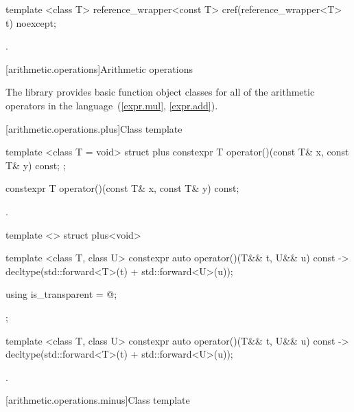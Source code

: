 %
\begin{itemdecl}
template <class T> reference_wrapper<const T> cref(reference_wrapper<T> t) noexcept;
\end{itemdecl}

\begin{itemdescr}
\pnum\returns {}.
\end{itemdescr}

[arithmetic.operations]{Arithmetic operations}

\pnum
The library provides basic function object classes for all of the arithmetic
operators in the language~(\ref{expr.mul}, \ref{expr.add}).

[arithmetic.operations.plus]{Class template }

%
\begin{itemdecl}
template <class T = void> struct plus {
  constexpr T operator()(const T& x, const T& y) const;
};
\end{itemdecl}

%
\begin{itemdecl}
constexpr T operator()(const T& x, const T& y) const;
\end{itemdecl}

\begin{itemdescr}
\pnum\returns {}.
\end{itemdescr}

%
\begin{itemdecl}
template <> struct plus<void> {
  template <class T, class U> constexpr auto operator()(T&& t, U&& u) const
    -> decltype(std::forward<T>(t) + std::forward<U>(u));

  using is_transparent = @\unspec@;
};
\end{itemdecl}

%
\begin{itemdecl}
template <class T, class U> constexpr auto operator()(T&& t, U&& u) const
    -> decltype(std::forward<T>(t) + std::forward<U>(u));
\end{itemdecl}

\begin{itemdescr}
\pnum\returns {}.
\end{itemdescr}

[arithmetic.operations.minus]{Class template }

